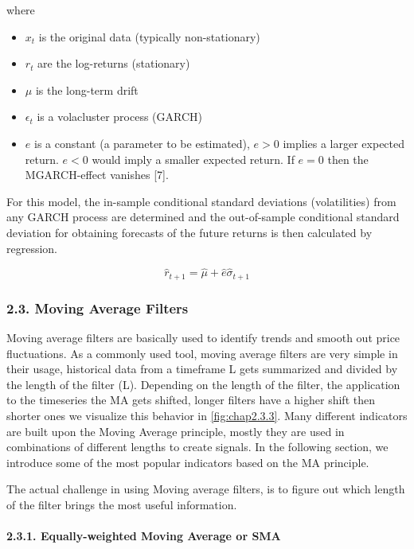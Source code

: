 \documentclass[
]{article}
\providecommand{\tightlist}{%
  \setlength{\itemsep}{0pt}\setlength{\parskip}{0pt}}
\begin{document}
where

\begin{itemize}
\tightlist
\item
  \(x_{t}\) is the original data (typically non-stationary)
\item
  \(r_{t}\) are the log-returns (stationary)
\item
  \(\mu\) is the long-term drift
\item
  \(\epsilon_{t}\) is a volacluster process (GARCH)
\item
  \(e\) is a constant (a parameter to be estimated), \(e>0\) implies a
  larger expected return. \(e<0\) would imply a smaller expected return.
  If \(e=0\) then the MGARCH-effect vanishes {[}7{]}.
\end{itemize}

For this model, the in-sample conditional standard deviations
(volatilities) from any GARCH process are determined and the
out-of-sample conditional standard deviation for obtaining forecasts of
the future returns is then calculated by regression.

\[\hat{r}_{t+1}=\hat{\mu}+\hat{e}\hat{\sigma}_{t+1}\]

\newpage

\hypertarget{moving-average-filters}{%
\subsubsection{2.3. Moving Average
Filters}\label{moving-average-filters}}

Moving average filters are basically used to identify trends and smooth
out price fluctuations. As a commonly used tool, moving average filters
are very simple in their usage, historical data from a timeframe L gets
summarized and divided by the length of the filter (L). Depending on the
length of the filter, the application to the timeseries the MA gets
shifted, longer filters have a higher shift then shorter ones we
visualize this behavior in \ref{fig:chap2.3.3}. Many different
indicators are built upon the Moving Average principle, mostly they are
used in combinations of different lengths to create signals. In the
following section, we introduce some of the most popular indicators
based on the MA principle.

The actual challenge in using Moving average filters, is to figure out
which length of the filter brings the most useful information.

\hypertarget{equally-weighted-moving-average-or-sma}{%
\paragraph{2.3.1. Equally-weighted Moving Average or
SMA}\label{equally-weighted-moving-average-or-sma}}
\end{document}
